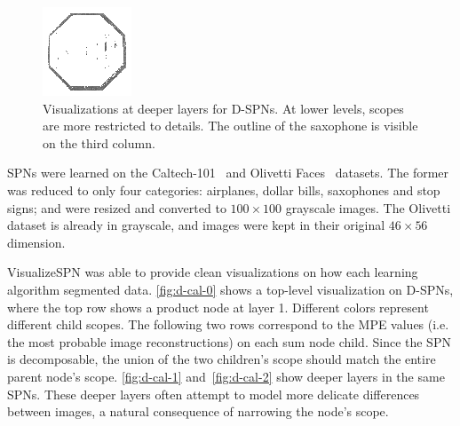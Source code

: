 \documentclass{article}
\begin{document}
\begin{figure}[!b]
\begin{minipage}[c]{.21\linewidth}
  \end{minipage}
  \begin{minipage}[c]{.21\linewidth}
    \centering\centerline{\includegraphics[width=\linewidth]{imgs/dennis_cal/stop/sums/497_995.png}}
  \end{minipage}
  \caption{Visualizations at deeper layers for D-SPNs. At lower levels, scopes are more restricted
    to details. The outline of the saxophone is visible on the third column.\label{fig:d-cal-2}}
\end{figure}

SPNs were learned on the Caltech-101~\cite{fei04} and Olivetti Faces~\cite{samaria94} datasets. The
former was reduced to only four categories: airplanes, dollar bills, saxophones and stop signs; and
were resized and converted to $100\times100$ grayscale images. The Olivetti dataset is already in
grayscale, and images were kept in their original $46\times 56$ dimension.

VisualizeSPN was able to provide clean visualizations on how each learning algorithm segmented
data. \autoref{fig:d-cal-0} shows a top-level visualization on D-SPNs, where the top row shows a
product node at layer 1. Different colors represent different child scopes. The following two rows
correspond to the MPE values (i.e. the most probable image reconstructions) on each sum node child.
Since the SPN is decomposable, the union of the two children's scope should match the entire parent
node's scope.  \autoref{fig:d-cal-1} and~\autoref{fig:d-cal-2} show deeper layers in the same SPNs.
These deeper layers often attempt to model more delicate differences between images, a natural
consequence of narrowing the node's scope.
\end{document}
